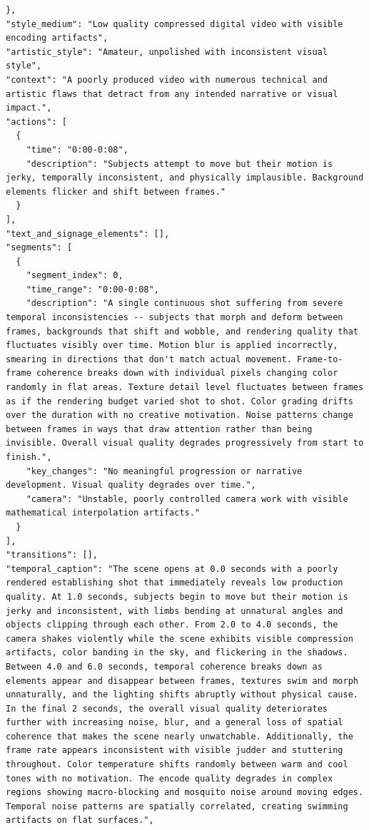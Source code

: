 \begin{tcolorbox}
\begin{Verbatim}[breaklines=true,breakanywhere=true,fontsize=\scriptsize]
},
"style_medium": "Low quality compressed digital video with visible encoding artifacts",
"artistic_style": "Amateur, unpolished with inconsistent visual style",
"context": "A poorly produced video with numerous technical and artistic flaws that detract from any intended narrative or visual impact.",
"actions": [
  {
    "time": "0:00-0:08",
    "description": "Subjects attempt to move but their motion is jerky, temporally inconsistent, and physically implausible. Background elements flicker and shift between frames."
  }
],
"text_and_signage_elements": [],
"segments": [
  {
    "segment_index": 0,
    "time_range": "0:00-0:08",
    "description": "A single continuous shot suffering from severe temporal inconsistencies -- subjects that morph and deform between frames, backgrounds that shift and wobble, and rendering quality that fluctuates visibly over time. Motion blur is applied incorrectly, smearing in directions that don't match actual movement. Frame-to-frame coherence breaks down with individual pixels changing color randomly in flat areas. Texture detail level fluctuates between frames as if the rendering budget varied shot to shot. Color grading drifts over the duration with no creative motivation. Noise patterns change between frames in ways that draw attention rather than being invisible. Overall visual quality degrades progressively from start to finish.",
    "key_changes": "No meaningful progression or narrative development. Visual quality degrades over time.",
    "camera": "Unstable, poorly controlled camera work with visible mathematical interpolation artifacts."
  }
],
"transitions": [],
"temporal_caption": "The scene opens at 0.0 seconds with a poorly rendered establishing shot that immediately reveals low production quality. At 1.0 seconds, subjects begin to move but their motion is jerky and inconsistent, with limbs bending at unnatural angles and objects clipping through each other. From 2.0 to 4.0 seconds, the camera shakes violently while the scene exhibits visible compression artifacts, color banding in the sky, and flickering in the shadows. Between 4.0 and 6.0 seconds, temporal coherence breaks down as elements appear and disappear between frames, textures swim and morph unnaturally, and the lighting shifts abruptly without physical cause. In the final 2 seconds, the overall visual quality deteriorates further with increasing noise, blur, and a general loss of spatial coherence that makes the scene nearly unwatchable. Additionally, the frame rate appears inconsistent with visible judder and stuttering throughout. Color temperature shifts randomly between warm and cool tones with no motivation. The encode quality degrades in complex regions showing macro-blocking and mosquito noise around moving edges. Temporal noise patterns are spatially correlated, creating swimming artifacts on flat surfaces.",

\end{Verbatim}
\end{tcolorbox}
